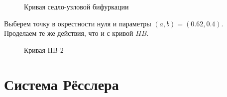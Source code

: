 \documentclass[12pt, a4paper]{article}
\begin{document}
\begin{figure}[H]
	\caption{Кривая седло-узловой бифуркации}
\end{figure}

Выберем точку в окрестности нуля и параметры $(a, b) = (0.62, 0.4)$. Проделаем те же действия, что и с кривой $HB$.

\begin{figure}[H]
	\caption{Кривая HB-2}
\end{figure}

\section{Система Рёсслера}
\end{document}
